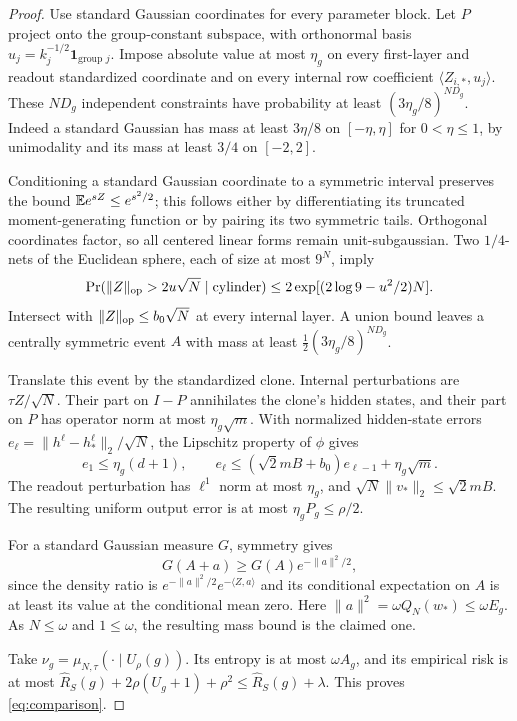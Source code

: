 \begin{proof}
Use standard Gaussian coordinates for every parameter block. Let $P$ project onto the group-constant subspace, with orthonormal basis $u_j=k_j^{-1/2}\mathbf1_{\text{group }j}$. Impose absolute value at most $\eta_g$ on every first-layer and readout standardized coordinate and on every internal row coefficient $\langle Z_{i,*},u_j\rangle$. These $ND_g$ independent constraints have probability at least $(3\eta_g/8)^{ND_g}$. Indeed a standard Gaussian has mass at least $3\eta/8$ on $[-\eta,\eta]$ for $0<\eta\le1$, by unimodality and its mass at least $3/4$ on $[-2,2]$.

Conditioning a standard Gaussian coordinate to a symmetric interval preserves the bound $\mathbb E e^{sZ}\le e^{s^2/2}$; this follows either by differentiating its truncated moment-generating function or by pairing its two symmetric tails. Orthogonal coordinates factor, so all centered linear forms remain unit-subgaussian. Two $1/4$-nets of the Euclidean sphere, each of size at most $9^N$, imply
\[
 \Pr(\|Z\|_{\mathrm{op}}>2u\sqrt N\mid\text{cylinder})
 \le2\exp[(2\log9-u^2/2)N].
\]
Intersect with $\|Z\|_{\mathrm{op}}\le b_0\sqrt N$ at every internal layer. A union bound leaves a centrally symmetric event $A$ with mass at least $\tfrac12(3\eta_g/8)^{ND_g}$.

Translate this event by the standardized clone. Internal perturbations are $\tau Z/\sqrt N$. Their part on $I-P$ annihilates the clone's hidden states, and their part on $P$ has operator norm at most $\eta_g\sqrt m$. With normalized hidden-state errors $e_\ell=\|h^\ell-h_*^\ell\|_2/\sqrt N$, the Lipschitz property of $\phi$ gives
\[
 e_1\le\eta_g(d+1),\qquad
 e_\ell\le(\sqrt2mB+b_0)e_{\ell-1}+\eta_g\sqrt m.
\]
The readout perturbation has $\ell^1$ norm at most $\eta_g$, and $\sqrt N\|v_*\|_2\le\sqrt2mB$. The resulting uniform output error is at most $\eta_g P_g\le\rho/2$.

For a standard Gaussian measure $G$, symmetry gives
\[
 G(A+a)\ge G(A)e^{-\|a\|^2/2},
\]
since the density ratio is $e^{-\|a\|^2/2}e^{-\langle Z,a\rangle}$ and its conditional expectation on $A$ is at least its value at the conditional mean zero. Here $\|a\|^2=\omega Q_N(w_*)\le\omega E_g$. As $N\le\omega$ and $1\le\omega$, the resulting mass bound is the claimed one.

Take $\nu_g=\mu_{N,\tau}(\cdot\mid U_\rho(g))$. Its entropy is at most $\omega A_g$, and its empirical risk is at most $\widehat R_S(g)+2\rho(U_g+1)+\rho^2\le\widehat R_S(g)+\lambda$. This proves \eqref{eq:comparison}.
\end{proof}
